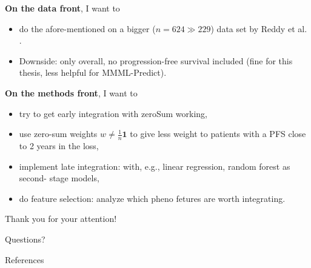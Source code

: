 \documentclass[10pt, aspectratio=169]{beamer}
\begin{document}
\begin{frame}{}
  \textbf{On the data front}, I want to  
  \begin{itemize}
    \item do the afore-mentioned on a \alert{bigger ($n = 624 \gg 229$) data set} by Reddy 
      et al. \autocite{reddy17}. 
    \item Downside: only overall, no progression-free survival included (fine 
      for this thesis, less helpful for MMML-Predict).
  \end{itemize}

  \textbf{On the methods front}, I want to 
  \begin{itemize}
    \item try to get \alert{early integration} with zeroSum working,
    \item use zero-sum weights $w \neq \frac{1}{n} \mathbf{1}$ to give less weight to patients with 
      a PFS close to 2 years in the loss,
    \item implement \alert{late integration}: with, e.g., linear regression, random forest as second-
      stage models,
    \item do \alert{feature selection}: analyze which pheno fetures are worth integrating.
  \end{itemize}
\end{frame}

\begin{frame}[standout]
  Thank you for your attention! \par Questions?
\end{frame}

\appendix

\begin{frame}[allowframebreaks]{References}
  \printbibliography
\end{frame}
\end{document}
